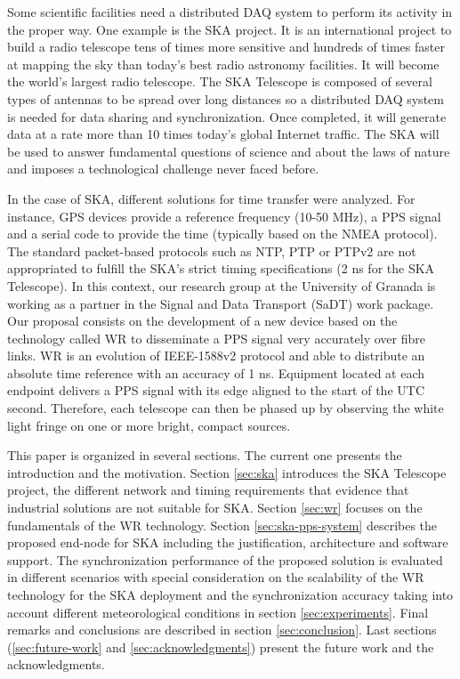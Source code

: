 Some scientific facilities need a distributed DAQ system to perform its activity in the proper way. One example is the SKA \cite{ska:project_website} project. It is an international project to build a radio telescope tens of times more sensitive and hundreds of times faster at mapping the sky than today's best radio astronomy facilities. It will become the world's largest radio telescope. The SKA Telescope is composed of several types of antennas to be spread over long distances so a distributed DAQ system is needed for data sharing and synchronization. Once completed, it will generate data at a rate more than 10 times today’s global Internet traffic. The SKA will be used to answer fundamental questions of science and about the laws of nature and imposes a technological challenge never faced before.

In the case of SKA, different solutions for time transfer were analyzed. For instance, GPS devices provide a reference frequency (10-50 MHz), a PPS signal and a serial code to provide the time (typically based on the NMEA protocol). The standard packet-based protocols such as NTP, PTP or PTPv2 are not appropriated to fulfill the SKA's strict timing specifications (2 ns for the SKA Telescope).
In this context, our research group at the University of Granada is working as a partner in the Signal and Data Transport (SaDT) \cite{ska:sadt_website} work package. Our proposal consists on the development of a new device based on the technology called WR \cite{ohwr:wr_wiki} to disseminate a PPS signal very accurately over fibre links. WR is an evolution of IEEE-1588v2 protocol and able to distribute an absolute time reference with an accuracy of 1 ns. Equipment located at each endpoint delivers a PPS signal with its edge aligned to the start of the UTC second. Therefore, each telescope can then be phased up by observing the white light fringe on one or more bright, compact sources.

This paper is organized in several sections. The current one 
presents the introduction and the motivation. Section \ref{sec:ska} introduces the SKA Telescope project, the different network and timing requirements that evidence that industrial solutions are not suitable for SKA. Section \ref{sec:wr} focuses on the fundamentals of the WR technology. Section \ref{sec:ska-pps-system} describes the proposed end-node for SKA including the justification, architecture and software support. The synchronization performance of the proposed solution is evaluated in different scenarios with special consideration on the scalability of the WR technology for the SKA deployment and the synchronization accuracy taking into account different meteorological conditions in section \ref{sec:experiments}. Final remarks and conclusions are described in section \ref{sec:conclusion}. Last sections (\ref{sec:future-work} and \ref{sec:acknowledgments}) present the future work and the acknowledgments.


